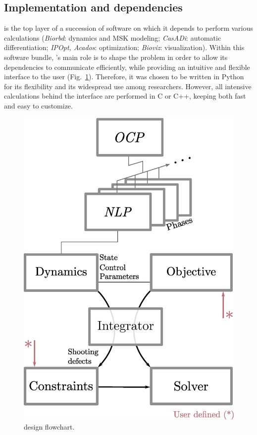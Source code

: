 \subsection{Implementation and dependencies}
\bioptim is the top layer of a succession of software on which it depends to perform various calculations (\textit{Biorbd}: dynamics and MSK modeling; \textit{CasADi}: automatic differentiation; \textit{IPOpt, Acados}: optimization; \textit{Bioviz}: visualization).
Within this software bundle, \bioptim 's main role is to shape the problem in order to allow its dependencies to communicate efficiently, while providing an intuitive and flexible interface to the user (Fig.~\ref{fig:dependencies}).
Therefore, it was chosen to be written in Python for its flexibility and its widespread use among researchers.
However, all intensive calculations behind the interface are performed in C or C++, keeping \bioptim both fast and easy to customize.

\begin{figure}[t!]
\centering
\includegraphics[width=0.9\columnwidth]{figures/design.eps}
\caption{\bioptim design flowchart.}
\label{fig:dependencies}
\vspace*{-0.5cm}
\end{figure}


